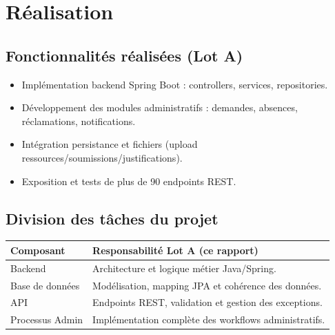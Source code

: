 \chapter{Réalisation}

\section{Fonctionnalités réalisées (Lot A)}
\begin{itemize}
  \item Implémentation backend Spring Boot : controllers, services, repositories.
  \item Développement des modules administratifs : demandes, absences, réclamations, notifications.
  \item Intégration persistance et fichiers (upload ressources/soumissions/justifications).
  \item Exposition et tests de plus de 90 endpoints REST.
\end{itemize}

\section{Division des tâches du projet}
\begin{tabularx}{\textwidth}{lX}
\toprule
\textbf{Composant} & \textbf{Responsabilité Lot A (ce rapport)} \\
\midrule
Backend & Architecture et logique métier Java/Spring. \\
Base de données & Modélisation, mapping JPA et cohérence des données. \\
API & Endpoints REST, validation et gestion des exceptions. \\
Processus Admin & Implémentation complète des workflows administratifs. \\
\bottomrule
\end{tabularx}
